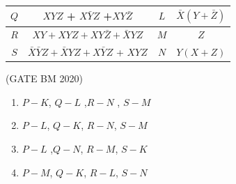 \begin{enumerate}[label=\arabic*.,ref=\theenumi]
\begin{table}[H]
{\begin{tabular}{|c|c|c|c|}
	\hline 

	$Q$ & $XYZ$ + $X\bar{Y}Z$ +$XY\bar{Z}$ & $L$ & $\bar{X}(Y+\bar{Z})$ \\

	\hline 

	$R$ & $XY + XYZ +XY\bar{Z} + \bar{X}YZ$ & $M$ & $Z$ \\

	\hline

	$S$ & $\bar{X}\bar{Y}Z + \bar{X}YZ + X\bar{Y}Z$ + $XYZ$ & $N$ & $Y(X+Z)$ \\

	\hline 
\end{tabular}
		}
		\caption{}
		\label{fig:GATE BM 2020}
	\end{table}
		\hfill(GATE BM 2020)
	\begin{enumerate}[label=(\Alph*)]
			\item $P-K$, $Q-L$ ,$R-N$ , $S-M$ \\
			\item $P-L$, $Q-K$, $R-N$, $S-M$ \\
			\item $P-L$ ,$Q-N$, $R-M$, $S-K$ \\
			\item $P-M$, $Q-K$, $R-L$, $S-N$ \\
	\end{enumerate}


\end{enumerate}
